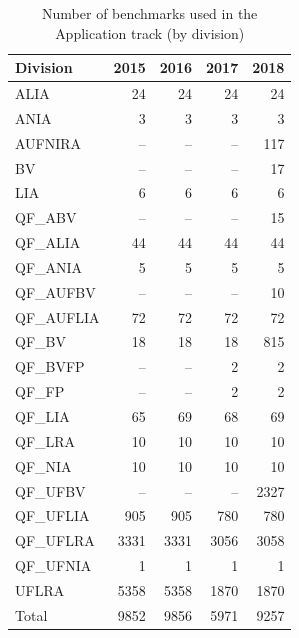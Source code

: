 \documentclass[dvipsnames,table,twoside,11pt]{article}
\begin{document}
\begin{table}
  \caption{Number of benchmarks used in the Application track (by
    division)}
  \label{table:benchmarks-application-track}
  \centering
  \begin{tabular}{lrrrr}
    \toprule
    Division & \multicolumn{1}{c}{2015} & \multicolumn{1}{c}{2016} & \multicolumn{1}{c}{2017} & \multicolumn{1}{c}{2018} \\
    \midrule
    ALIA       &   24 &   24 &   24 &   24 \\
    ANIA       &    3 &    3 &    3 &    3 \\
    AUFNIRA    &   -- &   -- &   -- &  117 \\
    BV         &   -- &   -- &   -- &   17 \\
    LIA        &    6 &    6 &    6 &    6 \\
    QF\_ABV    &   -- &   -- &   -- &   15 \\
    QF\_ALIA   &   44 &   44 &   44 &   44 \\
    QF\_ANIA   &    5 &    5 &    5 &    5 \\
    QF\_AUFBV  &   -- &   -- &   -- &   10 \\
    QF\_AUFLIA &   72 &   72 &   72 &   72 \\
    QF\_BV     &   18 &   18 &   18 &  815 \\
    QF\_BVFP   &   -- &   -- &    2 &    2 \\
    QF\_FP     &   -- &   -- &    2 &    2 \\
    QF\_LIA    &   65 &   69 &   68 &   69 \\
    QF\_LRA    &   10 &   10 &   10 &   10 \\
    QF\_NIA    &   10 &   10 &   10 &   10 \\
    QF\_UFBV   &   -- &   -- &   -- & 2327 \\
    QF\_UFLIA  &  905 &  905 &  780 &  780 \\
    QF\_UFLRA  & 3331 & 3331 & 3056 & 3058 \\
    QF\_UFNIA  &    1 &    1 &    1 &    1 \\
    UFLRA      & 5358 & 5358 & 1870 & 1870 \\
    \midrule
    Total      & 9852 & 9856 & 5971 & 9257 \\
    \bottomrule
  \end{tabular}
\end{table}
\end{document}
